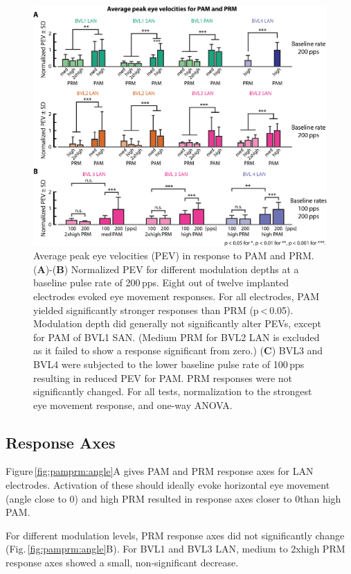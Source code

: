 \begin{figure}[btp]
\centering
\includegraphics[width=\textwidth]{chapters/partii/pamprm/figures/Fig_pamprm_pev.eps} 
\caption[Average peak eye velocities to PAM and PRM]{Average peak eye velocities (PEV) in response to PAM and PRM. (\textbf{A})-(\textbf{B}) Normalized PEV for different modulation depths at a baseline pulse rate of 200\,pps. Eight out of twelve implanted electrodes evoked eye movement responses. For all electrodes, PAM yielded significantly stronger responses than PRM (p\,\textless\,0.05). Modulation depth did generally not significantly alter PEVs, except for PAM of BVL1 SAN. (Medium PRM for BVL2 LAN is excluded as it failed to show a response significant from zero.) (\textbf{C}) BVL3 and BVL4 were subjected to the lower baseline pulse rate of 100\,pps resulting in reduced PEV for PAM. PRM responses were not significantly changed. For all tests, normalization to the strongest eye movement response, and one-way ANOVA.}
\label{fig:pamprm:pev}
\end{figure}

\subsection{Response Axes}
Figure\,\ref{fig:pamprm:angle}A gives PAM and PRM response axes for LAN electrodes. Activation of these should ideally evoke horizontal eye movement (angle close to 0\degree) and high PRM resulted in response axes closer to 0\degree than high PAM. 

For different modulation levels, PRM response axes did not significantly change (Fig.\,\ref{fig:pamprm:angle}B). For BVL1 and BVL3 LAN, medium to 2xhigh PRM response axes showed a small, non-significant decrease. 

